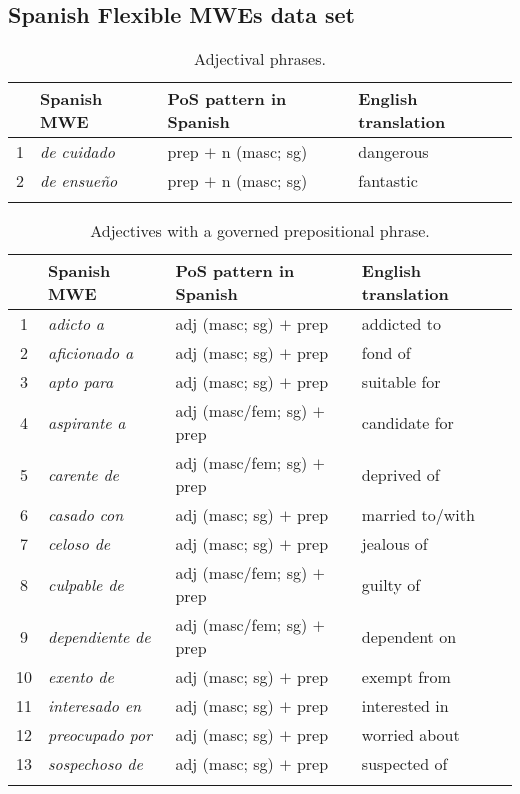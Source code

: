 \documentclass[output=paper]{langsci/langscibook}
\begin{document}

\clearpage 
\subsection{Spanish Flexible MWEs data set}
\label{sec:appendixC_flexibleMWEs}

\begin{table}

\caption{Adjectival phrases.}
\label{tab:adjPhrases-flexible}
\begin{tabularx}{\textwidth}{cXll}
\lsptoprule
 &{\textbf{Spanish MWE}} &{\textbf{PoS pattern in Spanish}} &{\textbf{English translation}} \\ %
\midrule
1 & \textit{de cuidado} & prep $+$ n (masc; sg) & dangerous \\
2 & \textit{de ensueño} & prep $+$ n (masc; sg) & fantastic\\
\lspbottomrule
\end{tabularx}
\end{table}

\begin{table}
\caption{Adjectives with a governed prepositional phrase.}
\label{tab:adjPPs}
\begin{tabularx}{\textwidth}{cXll} 
\lsptoprule
 &{\textbf{Spanish MWE}} &{\textbf{PoS pattern in Spanish}} &{\textbf{English translation}} \\ %
\midrule
1 & \textit{adicto a} & adj (masc; sg) $+$ prep & addicted to \\
2 & \textit{aficionado a} & adj (masc; sg) $+$ prep & fond of \\
3 & \textit{apto para} & adj (masc; sg) $+$ prep & suitable for \\
4 & \textit{aspirante a} & adj (masc/fem; sg) $+$ prep & candidate for \\
5 & \textit{carente de} & adj (masc/fem; sg) $+$ prep & deprived of \\
6 & \textit{casado con} & adj (masc; sg) $+$ prep & married to/with \\
7 & \textit{celoso de} & adj (masc; sg) $+$ prep & jealous of \\
8 & \textit{culpable de} & adj (masc/fem; sg) $+$ prep & guilty of \\
9 & \textit{dependiente de} & adj (masc/fem; sg) $+$ prep & dependent on \\
10 & \textit{exento de} & adj (masc; sg) $+$ prep & exempt from \\
11 & \textit{interesado en} & adj (masc; sg) $+$ prep & interested in \\
12 & \textit{preocupado por} & adj (masc; sg) $+$ prep & worried about \\
13 & \textit{sospechoso de} & adj (masc; sg) $+$ prep & suspected of\\
\lspbottomrule
\end{tabularx}
\end{table}
\end{document}
